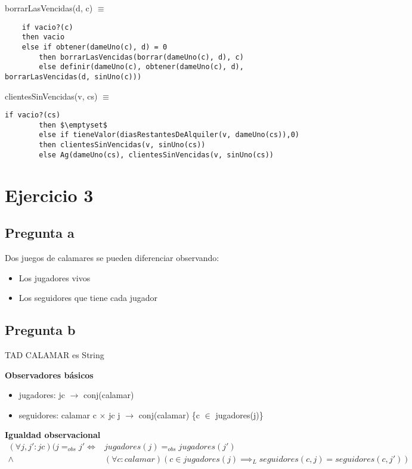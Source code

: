 borrarLasVencidas(d, c) $\equiv$ 
\begin{lstlisting}
    if vacio?(c)
    then vacio
    else if obtener(dameUno(c), d) = 0
        then borrarLasVencidas(borrar(dameUno(c), d), c)
        else definir(dameUno(c), obtener(dameUno(c), d), borrarLasVencidas(d, sinUno(c)))
\end{lstlisting}

clientesSinVencidas(v, cs) $\equiv$ 
\begin{lstlisting}[mathescape=true]
    if vacio?(cs)
        then $\emptyset$
        else if tieneValor(diasRestantesDeAlquiler(v, dameUno(cs)),0)
        then clientesSinVencidas(v, sinUno(cs))
        else Ag(dameUno(cs), clientesSinVencidas(v, sinUno(cs))
\end{lstlisting}

\section{Ejercicio 3}

\subsection*{Pregunta a}
Dos juegos de calamares se pueden diferenciar observando:
\begin{itemize}
    \item Los jugadores vivos
    \item Los seguidores que tiene cada jugador
\end{itemize}
    
\subsection*{Pregunta b}

TAD CALAMAR es String

\textbf{Observadores básicos}
\begin{itemize}
    \item jugadores: jc $\rightarrow$ conj(calamar)
    \item seguidores: calamar c $\times$ jc j $\rightarrow$ conj(calamar) \{c $\in$ jugadores(j)\}
\end{itemize}


\textbf{Igualdad observacional}
\begin{align*}
(\forall j, j': jc)(j =_{obs} j' \iff &jugadores(j) =_{obs} jugadores(j') \\
                    \wedge &(\forall c: calamar)(c \in jugadores(j) \implies_{L} seguidores(c,j) = seguidores(c, j'))
\end{align*}
   

